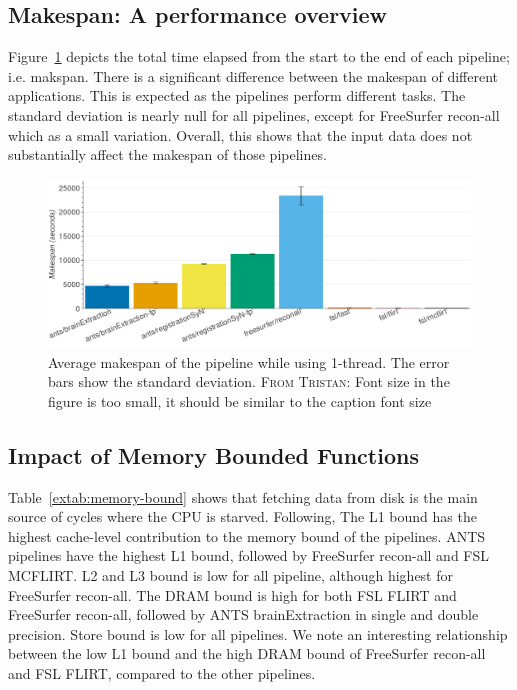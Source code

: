\documentclass[conference]{IEEEtran}
\newcommand{\TG}[1]{\color{blue}\textsc{From Tristan: }#1\color{black}}
\begin{document}
\subsection{Makespan: A performance overview}
Figure~\ref{fig:makespan-1thread} depicts the total time elapsed from the start to the end of each pipeline; i.e. makspan. There is a significant difference between the makespan of different applications. This is expected as the pipelines perform different tasks. The standard deviation is nearly null for all pipelines, except for FreeSurfer recon-all which as a small variation. Overall, this shows that the input data does not substantially affect the makespan of those pipelines.
\begin{figure}[h]
	\centering
	\includegraphics[width=\linewidth]{figures/makespan-1thread.png}
	\caption{Average makespan of the pipeline while using 1-thread. The error bars show the standard deviation. \TG{Font size in the figure is too small, it should be similar to the caption font size}}
	\label{fig:makespan-1thread}
\end{figure}

\subsection{Impact of Memory Bounded Functions}
Table~\ref{extab:memory-bound} shows that fetching data from disk is the main source of cycles where the CPU is starved. Following, The L1 bound has the highest cache-level contribution to the memory bound of the pipelines. ANTS pipelines have the highest L1 bound, followed by FreeSurfer recon-all and FSL MCFLIRT. L2 and L3 bound is low for all pipeline, although highest for FreeSurfer recon-all. The DRAM bound is high for both FSL FLIRT and FreeSurfer recon-all, followed by ANTS brainExtraction in single and double precision. Store bound is low for all pipelines. We note an interesting relationship between the low L1 bound and the high DRAM bound of FreeSurfer recon-all and FSL FLIRT, compared to the other pipelines.
\end{document}
